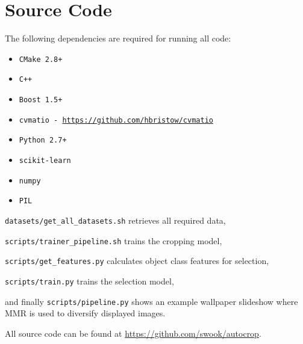 %
\chapter{Source Code}

The following dependencies are required for running all code:
\begin{itemize}
\item \texttt{CMake 2.8+}
\item \texttt{C++}
\item \texttt{Boost 1.5+}
\item \texttt{cvmatio - \url{https://github.com/hbristow/cvmatio}}
\item \texttt{Python 2.7+}
\item \texttt{scikit-learn}
\item \texttt{numpy}
\item \texttt{PIL}
\end{itemize}

\noindent
\texttt{datasets/get\_all\_datasets.sh} retrieves all required data,

\noindent
\texttt{scripts/trainer\_pipeline.sh} trains the cropping model,

\noindent
\texttt{scripts/get\_features.py} calculates object class features for selection,

\noindent
\texttt{scripts/train.py} trains the selection model,

\noindent
and finally \texttt{scripts/pipeline.py} shows an example wallpaper slideshow
where MMR is used to diversify displayed images.

\vskip15pt

\noindent
All source code can be found at \url{https://github.com/swook/autocrop}.

